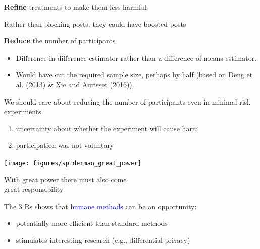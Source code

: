 \documentclass[aspectratio=169]{beamer}
\begin{document}
\begin{frame}

\begin{framed}
\textbf{Refine} treatments to make them less harmful
\end{framed}

\pause
Rather than blocking posts, they could have boosted posts

\end{frame}
\begin{frame}

\begin{framed}
\textbf{Reduce} the number of participants
\end{framed}

\pause
\begin{itemize}
\item Difference-in-difference estimator rather than a difference-of-means estimator.  
\pause
\item Would have cut the required sample size, perhaps by half (based on Deng et al. (2013) \& Xie and Aurisset (2016)).
\end{itemize}

\end{frame}
\begin{frame}

We should care about reducing the number of participants even in minimal risk experiments \pause
\begin{enumerate}
\item uncertainty about whether the experiment will cause harm
\item participation was not voluntary
\end{enumerate}

\end{frame}
\begin{frame}

\begin{center}
\texttt{[image: figures/spiderman\_great\_power]}
\end{center}

\pause

\LARGE{
\begin{center}
With great power there must also come\\great responsibility
\end{center}
}

\end{frame}
\begin{frame}

The 3 Rs shows that \textcolor{blue}{humane methods} can be an opportunity:
\pause
\begin{itemize}
\item potentially more efficient than standard methods
\pause
\item stimulates interesting research (e.g., differential privacy)
\end{itemize}

\end{frame}
\frame{\titlepage}
\end{document}
